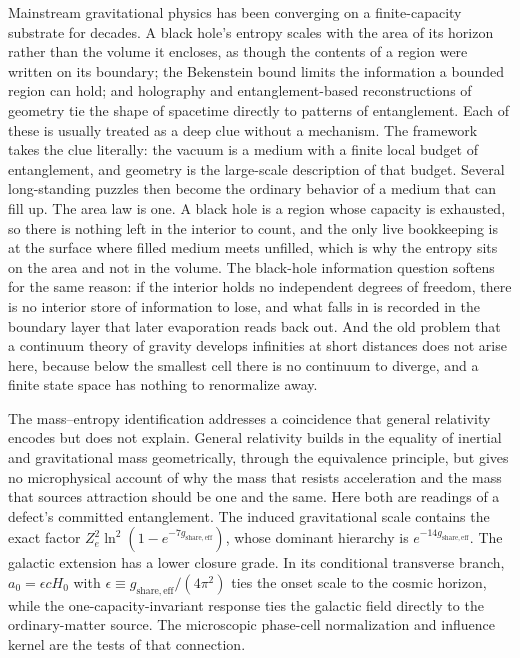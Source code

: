 \documentclass[11pt]{article}
\begin{document}
Mainstream gravitational physics has been converging on a finite-capacity substrate for decades. A black hole's entropy scales with the area of its horizon rather than the volume it encloses, as though the contents of a region were written on its boundary; the Bekenstein bound limits the information a bounded region can hold; and holography and entanglement-based reconstructions of geometry tie the shape of spacetime directly to patterns of entanglement. Each of these is usually treated as a deep clue without a mechanism. The framework takes the clue literally: the vacuum is a medium with a finite local budget of entanglement, and geometry is the large-scale description of that budget. Several long-standing puzzles then become the ordinary behavior of a medium that can fill up. The area law is one. A black hole is a region whose capacity is exhausted, so there is nothing left in the interior to count, and the only live bookkeeping is at the surface where filled medium meets unfilled, which is why the entropy sits on the area and not in the volume. The black-hole information question softens for the same reason: if the interior holds no independent degrees of freedom, there is no interior store of information to lose, and what falls in is recorded in the boundary layer that later evaporation reads back out. And the old problem that a continuum theory of gravity develops infinities at short distances does not arise here, because below the smallest cell there is no continuum to diverge, and a finite state space has nothing to renormalize away.

The mass--entropy identification addresses a coincidence that general relativity encodes but does not explain. General relativity builds in the equality of inertial and gravitational mass geometrically, through the equivalence principle, but gives no microphysical account of why the mass that resists acceleration and the mass that sources attraction should be one and the same. Here both are readings of a defect's committed entanglement. The induced gravitational scale contains the exact factor $Z_e^2\ln^2(1-e^{-7g_{\mathrm{share,eff}}})$, whose dominant hierarchy is $e^{-14g_{\mathrm{share,eff}}}$. The galactic extension has a lower closure grade. In its conditional transverse branch, $a_0=\epsilon cH_0$ with $\epsilon\equiv g_{\mathrm{share,eff}}/(4\pi^2)$ ties the onset scale to the cosmic horizon, while the one-capacity-invariant response ties the galactic field directly to the ordinary-matter source. The microscopic phase-cell normalization and influence kernel are the tests of that connection.
\end{document}

